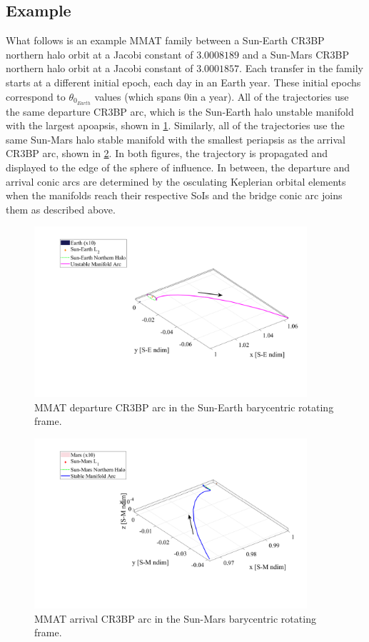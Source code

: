 \subsection{Example}
What follows is an example MMAT family between a Sun-Earth CR3BP northern halo orbit at a Jacobi
constant of $3.0008189$ and a Sun-Mars CR3BP northern halo orbit at a Jacobi constant of
$3.0001857$. Each transfer in the family starts at a different initial epoch, each day in an Earth
year. These initial epochs correspond to $\theta_{0_{Earth}}$ values (which spans
0\textdegree in a year). All of the trajectories use the same departure CR3BP arc,
which is the Sun-Earth halo unstable manifold with the largest apoapsis, shown in
\cref{fig:MMATSE}. Similarly, all of the trajectories use the same Sun-Mars halo stable manifold
with the smallest periapsis as the arrival CR3BP arc, shown in \cref{fig:MMATSM}. In both figures,
the trajectory is propagated and displayed to the edge of the sphere of influence. In between, the
departure and arrival conic arcs are determined by the osculating Keplerian orbital elements when
the manifolds reach their respective SoIs and the bridge conic arc joins them as described above.

\begin{figure}[ht]
    \centering
    \includegraphics[width=0.9\textwidth]{figures/MinDvSE.pdf}
    \caption{MMAT departure CR3BP arc in the Sun-Earth barycentric rotating frame.}
    \label{fig:MMATSE}
\end{figure}

\begin{figure}[ht]
    \centering
    \includegraphics[width=0.9\textwidth]{figures/MinDvSM.pdf}
    \caption{MMAT arrival CR3BP arc in the Sun-Mars barycentric rotating frame.}
    \label{fig:MMATSM}
\end{figure}

